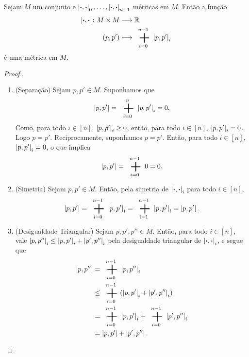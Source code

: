 \begin{proposition}
Sejam $M$ um conjunto e $\left\vert{\bm{\cdot}},{\bm{\cdot}}\right\vert_0, \ldots, \left\vert{\bm{\cdot}},{\bm{\cdot}}\right\vert_{n-1}$ métricas em $M$. Então a função
	\begin{align*}
		\func{\dist{\var}{\var}}{M \times M}{\R}{(p,p')}{\sum_{i=0}^{n-1} \dist{p}{p'}_i}
	\end{align*}
é uma métrica em $M$.
\end{proposition}
\begin{proof}
	\begin{enumerate}
	\item (Separação) Sejam $p,p' \in M$. Suponhamos que
	\begin{equation*}
	\dist{p}{p'} = \sum_{i=0}^n \dist{p}{p'}_i = 0.
	\end{equation*}
Como, para todo $i \in [n]$, $\left\vert{p},{p'}\right\vert_i \geq 0$, então, para todo $i \in [n]$, $\left\vert{p},{p'}\right\vert_i = 0$. Logo $p=p'$. Reciprocamente, suponhamos $p=p'$. Então, para todo $i \in [n]$, $\left\vert{p},{p'}\right\vert_i=0$, o que implica
	\begin{equation*}
	\dist{p}{p'} = \sum_{i=0}^{n-1} 0 = 0.
	\end{equation*}
	
	\item (Simetria) Sejam $p,p' \in M$. Então, pela simetria de $\left\vert{\bm{\cdot}},{\bm{\cdot}}\right\vert_i$ para todo $i \in [n]$,
	\begin{equation*}
	\dist{p}{p'} = \sum_{i=0}^{n-1} \dist{p}{p'}_i = \sum_{i=1}^{n-1} \dist{p}{p'}_i = \dist{p}{p'}.
	\end{equation*}
	
	\item (Desigualdade Triangular) Sejam $p,p',p'' \in M$. Então, para todo $i \in [n]$, vale $\left\vert{p},{p''}\right\vert_i \leq \left\vert{p},{p'}\right\vert_i+\left\vert{p'},{p''}\right\vert_i$ pela desigualdade triangular de $\left\vert{\bm{\cdot}},{\bm{\cdot}}\right\vert_i$, e segue que
	\begin{align*}
	\dist{p}{p''} &= \sum_{i=0}^{n-1} \dist{p}{p''}_i \\
				&\leq \sum_{i=0}^{n-1} (\dist{p}{p'}_i+\dist{p'}{p''}_i) \\
				&= \sum_{i=0}^{n-1} \dist{p}{p'}_i + \sum_{i=0}^{n-1} \dist{p'}{p''}_i \\
				&= \dist{p}{p'}+\dist{p'}{p''}. \qedhere
	\end{align*}
	\end{enumerate}
\end{proof}

